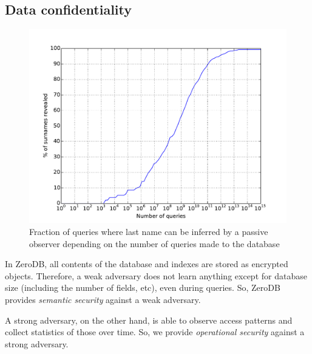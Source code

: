 \documentclass[notitlepage]{revtex4-1}
\begin{document}
\subsection{Data confidentiality}

\begin{figure}
	\begin{center}
        \includegraphics[width=0.7\columnwidth]{surname-attack.pdf}
	\end{center}
    \caption{Fraction of queries where last name can be inferred by a passive observer depending on the number of queries made to the database}
	\label{fig:surname-attack}
\end{figure}

In ZeroDB, all contents of the database and indexes are stored as encrypted objects.
Therefore, a weak adversary does not learn anything except for database size (including the number of fields, etc), even during queries.
So, ZeroDB provides \emph{semantic security} against a weak adversary.

A strong adversary, on the other hand, is able to observe access patterns and collect statistics of those over time.
So, we provide \emph{operational security} against a strong adversary.
\end{document}
